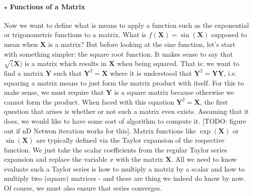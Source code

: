 \paragraph{$\star$ Functions of a Matrix}
Now we want to define what is means to apply a function such as the exponential or trigonometric functions to a matrix. What is $f(\mathbf{X}) = \sin(\mathbf{X})$ supposed to mean when $\mathbf{X}$ is a matrix? But before looking at the sine function, let's start with something simpler: the square root function. It makes sense to say that $\sqrt(\mathbf{X})$ is a matrix which results in $\mathbf{X}$ when being squared. That is: we want to find a matrix $\mathbf{Y}$ such that $\mathbf{Y}^2 = \mathbf{X}$ where it is understood that $\mathbf{Y}^2 = \mathbf{Y Y}$, i.e. squaring a matrix means to just form the matrix product with itself. For this to make sense, we must require that $\mathbf{Y}$ is a square matrix because otherwise we cannot form the product. When faced with this equation $\mathbf{Y}^2 = \mathbf{X}$, the first question that arises is whether or not such a matrix even exists. Assuming that it does, we would like to have some sort of algorithm to compute it. [TODO: figure out if nD Netwon iteration works for this]. Matrix functions like $\exp(\mathbf{X})$ or $\sin(\mathbf{X})$ are typically defined via the Taylor expansion of the respective function. We just take the scalar coefficients from the regular Taylor series expansion and replace the variable $x$ with the matrix  $\mathbf{X}$. All we need to know evaluate such a Taylor series is how to multiply a matrix by a scalar and how to multiply two (square) matrices - and these are thing we indeed do know by now. Of course, we must also ensure that series converges.





